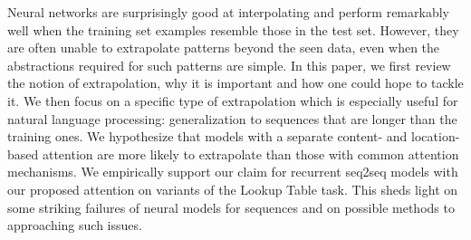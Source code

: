 Neural networks are surprisingly good at interpolating and perform remarkably well when the training set examples resemble those in the test set. However, they are often unable to extrapolate patterns beyond the seen data, even when the abstractions required for such patterns are simple. In this paper, we first review the notion of extrapolation, why it is important and how one could hope to tackle it. We then focus on a specific type of extrapolation which is especially useful for natural language processing: generalization to sequences that are longer than the training ones. We hypothesize that models with a separate content- and location-based attention are more likely to extrapolate than those with common attention mechanisms. We empirically support our claim for recurrent seq2seq models with our proposed attention on variants of the Lookup Table task. This sheds light on some striking failures of neural models for sequences and on possible methods to approaching such issues.

